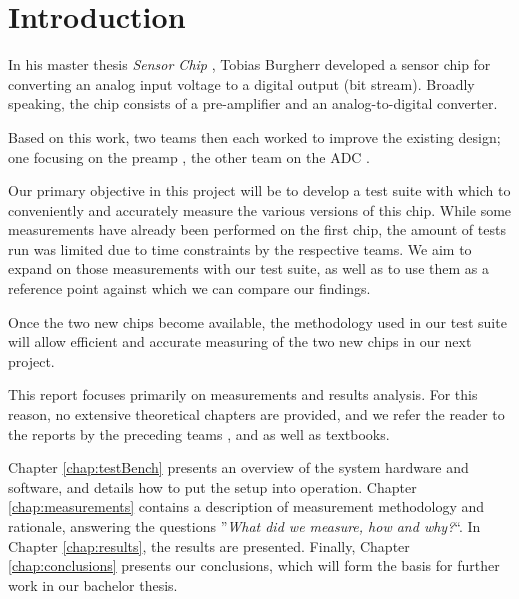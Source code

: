 \chapter{Introduction}
\label{ch:introduction}


In his  master thesis \emph{Sensor Chip}  \cite{ref:burgherr}, Tobias Burgherr
developed a  sensor chip for converting  an analog input voltage  to a digital
output (bit  stream). Broadly speaking, the  chip consists of  a pre-amplifier
and an analog-to-digital converter.

Based on this work, two teams then each worked to improve the existing design;
one  focusing on  the  preamp  \cite{ref:gloor}, the  other  team  on the  ADC
\cite{ref:baier}.

Our primary  objective in this  project will be to  develop a test  suite with
which  to conveniently  and accurately  measure the  various versions  of this
chip.  While some measurements have already  been performed on the first chip,
the amount of tests run was limited  due to time constraints by the respective
teams.  We aim to expand on those measurements with our test suite, as well as
to use them as a reference point against which we can compare our findings.

Once the  two new  chips become  available, the methodology  used in  our test
suite will allow efficient and accurate measuring  of the two new chips in our
next project.

This  report  focuses  primarily  on measurements  and  results  analysis. For
this  reason, no  extensive theoretical  chapters are  provided, and  we refer
the  reader  to  the  reports  by  the  preceding  teams  \cite{ref:burgherr},
\cite{ref:gloor} and \cite{ref:baier} as well as textbooks.

Chapter  \ref{chap:testBench}  presents an  overview  of  the system  hardware
and  software,  and details  how  to  put  the setup  into  operation. Chapter
\ref{chap:measurements} contains a description  of measurement methodology and
rationale,  answering  the questions  ''\emph{What  did  we measure,  how  and
why?}``. In  Chapter \ref{chap:results},  the results  are presented. Finally,
Chapter \ref{chap:conclusions}  presents our conclusions, which  will form the
basis for further work in our bachelor thesis.
